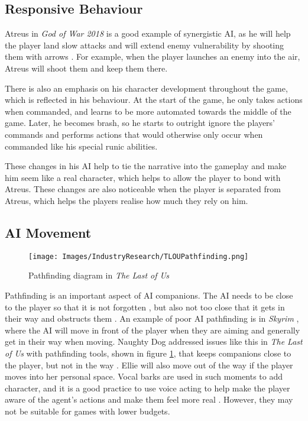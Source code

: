 \documentclass{IEEEtran}
\begin{document}
\subsection{Responsive Behaviour}
\label{Responsive Behaviour}

Atreus in \textit{God of War 2018} is a good example of synergistic AI, as he will help the player land slow attacks and will extend enemy vulnerability by shooting them with arrows \cite{GDCAtreus}. For example, when the player launches an enemy into the air, Atreus will shoot them and keep them there.

There is also an emphasis on his character development throughout the game, which is reflected in his behaviour. At the start of the game, he only takes actions when commanded, and learns to be more automated towards the middle of the game. Later, he becomes brash, so he starts to outright ignore the players’ commands and performs actions that would otherwise only occur when commanded like his special runic abilities.

These changes in his AI help to tie the narrative into the gameplay and make him seem like a real character, which helps to allow the player to bond with Atreus. These changes are also noticeable when the player is separated from Atreus, which helps the players realise how much they rely on him.


\subsection{AI Movement}
\label{Movement}

\begin{figure}
  \centering
  \texttt{[image: Images/IndustryResearch/TLOUPathfinding.png]}
  
\caption{Pathfinding diagram in \textit{The Last of Us}}
\label{fig:TLOUPathfinding}
\end{figure}

Pathfinding is an important aspect of AI companions. The AI needs to be close to the player so that it is not forgotten \cite{GAIP2EllieAI}, but also not too close that it gets in their way and obstructs them \cite{CoupledEmpowermentMaximisation}. An example of poor AI pathfinding is in \textit{Skyrim} \cite{tremblay2013adaptive}, where the AI will move in front of the player when they are aiming and generally get in their way when moving. Naughty Dog addressed issues like this in \textit{The Last of Us} with pathfinding tools, shown in figure \ref{fig:TLOUPathfinding}, that keeps companions close to the player, but not in the way \cite{GAIP2EllieAI}. Ellie will also move out of the way if the player moves into her personal space. Vocal barks are used in such moments to add character, and it is a good practice to use voice acting to help make the player aware of the agent’s actions and make them feel more real \cite{GMTGoodAI}. However, they may not be suitable for games with lower budgets.
\end{document}
